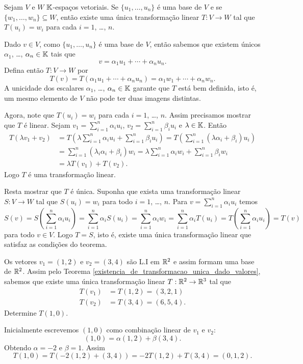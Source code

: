 \begin{teorema}\label{existencia_de_transformacao_unica_dado_valores}
	Sejam $V$ e $W$ $\mathbb{K}$-espa\c{c}os vetoriais. Se $\{u_1, \dots, u_n\}$ \'e uma base de $V$ e se $\{w_1, \dots, w_n\} \subseteq W$, ent\~ao existe uma \'unica transforma\c{c}\~ao linear $T : V \to W$ tal que $T(u_i) = w_i$ para cada $i = 1$, \dots, $n$.
\end{teorema}
\begin{prova}
	Dado $v \in V$, como $\{u_1, \dots, u_n\}$ \'e uma base de $V$, ent\~ao sabemos que existem \'unicos $\alpha_1$, \dots, $\alpha_n \in \mathbb{K}$ tais que
	\[
		v = \alpha_1u_1 + \cdots + \alpha_nu_n.
	\]
	Defina ent\~ao $T : V \to W$ por
	\[
		T(v) = T(\alpha_1u_1 + \cdots + \alpha_nu_n) = \alpha_1w_1 + \cdots + \alpha_nw_n.
	\]
	A unicidade dos escalares $\alpha_1$, \dots, $\alpha_n \in \mathbb{K}$ garante que $T$ est\'a bem definida, isto \'e, um mesmo elemento de $V$ n\~ao pode ter duas imagens distintas.

	Agora, note que $T(u_i) = w_i$ para cada $i = 1$, \dots, $n$. Assim precisamos mostrar que $T$ \'e linear. Sejam $v_1 = \sum_{i=1}^n\alpha_iu_i$, $v_2 = \sum_{i=1}^n\beta_iu_i$ e $\lambda \in \mathbb{K}$. Ent\~ao
	\begin{align*}
		T(\lambda v_1 + v_2) &= T(\lambda\sum_{i=1}^n\alpha_iu_i + \sum_{i=1}^n\beta_iu_i) = T(\sum_{i=1}^n(\lambda\alpha_i + \beta_i)u_i) \\ &= \sum_{i=1}^n(\lambda_i\alpha_i + \beta_i)w_i = \lambda\sum_{i=1}^n\alpha_iw_i + \sum_{i=1}^n\beta_iw_i \\ &= \lambda T(v_1) + T(v_2).
	\end{align*}
	Logo $T$ \'e uma transforma\c{c}\~ao linear.

	Resta mostrar que $T$ \'e \'unica. Suponha que exista uma transforma\c{c}\~ao linear $S : V \to W$ tal que $S(u_i) = w_i$ para todo $i = 1$, \dots, $n$. Para $v = \sum_{i=1}^n\alpha_iu_i$ temos
	\[
		S(v) = S(\sum_{i=1}^n\alpha_iu_i) = \sum_{i=1}^n\alpha_iS(u_i) = \sum_{i=1}^n\alpha_iw_i = \sum_{i=1}^n\alpha_iT(u_i) = T(\sum_{i=1}^n\alpha_iu_i) = T(v)
	\]
	para todo $v \in V$. Logo $T=S$, isto \'e, existe uma \'unica transforma\c{c}\~ao linear que satisfaz as condi\c{c}\~oes do teorema.
\end{prova}

\begin{exemplo}
	Os vetores $v_1 = (1,2)$ e $v_2 = (3,4)$ s\~ao L.I em $\mathbb{R}^2$ e assim formam uma base de $\mathbb{R}^2$. Assim pelo Teorema \ref{existencia_de_transformacao_unica_dado_valores}, sabemos que existe uma \'unica transforma\c{c}\~ao linear $T : \mathbb{R}^2 \to \mathbb{R}^3$ tal que
	\begin{align*}
		T(v_1) &= T(1,2) = (3,2,1)\\
		T(v_2) &= T(3,4) = (6,5,4).
	\end{align*}
	Determine $T(1,0)$.
\end{exemplo}
\begin{solucao}
	Inicialmente escrevemos $(1,0)$ como combina\c{c}\~ao linear de $v_1$ e $v_2$:
	\[
		(1, 0) = \alpha(1,2) + \beta(3,4).
	\]
	Obtendo $\alpha = -2$ e $\beta = 1$. Assim
	\[
		T(1,0) = T(-2(1,2) + (3,4)) = -2T(1,2) + T(3,4) = (0,1,2).
	\]
\end{solucao}

